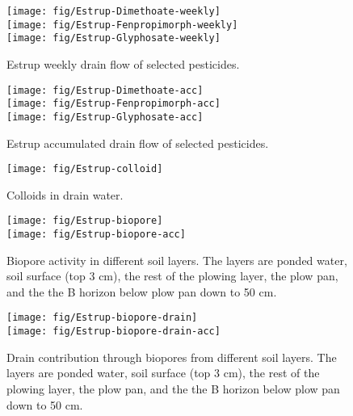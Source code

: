 \begin{figure}[htbp]
  \begin{center}
    \texttt{[image: fig/Estrup-Dimethoate-weekly]}\\
    \texttt{[image: fig/Estrup-Fenpropimorph-weekly]}\\
    \texttt{[image: fig/Estrup-Glyphosate-weekly]}\\
  \end{center}
  \caption{Estrup weekly drain flow of selected pesticides.}
  \label{fig:Estrup-weekly}
\end{figure}\FloatBarrier

\begin{figure}[htbp]
  \begin{center}
    \texttt{[image: fig/Estrup-Dimethoate-acc]}\\
    \texttt{[image: fig/Estrup-Fenpropimorph-acc]}\\
    \texttt{[image: fig/Estrup-Glyphosate-acc]}\\
  \end{center}
  \caption{Estrup accumulated drain flow of selected pesticides.}
  \label{fig:Estrup-acc}
\end{figure}\FloatBarrier

\begin{figure}[htbp]
  \begin{center}
    \texttt{[image: fig/Estrup-colloid]}
  \end{center}
  \caption{Colloids in drain water.}
  \label{fig:Estrup-colloids}
\end{figure}\FloatBarrier

\begin{figure}[htbp]
  \begin{center}
    \texttt{[image: fig/Estrup-biopore]}\\
    \texttt{[image: fig/Estrup-biopore-acc]}\\
  \end{center}
  \caption{Biopore activity in different soil layers.  The layers are
    ponded water, soil surface (top 3 cm), the rest of the plowing layer,
    the plow pan, and the the B horizon below plow pan down to 50 cm.}
  \label{fig:Estrup-biopore}
\end{figure}\FloatBarrier

\begin{figure}[htbp]
  \begin{center}
    \texttt{[image: fig/Estrup-biopore-drain]}\\
    \texttt{[image: fig/Estrup-biopore-drain-acc]}
  \end{center}
  \caption{Drain contribution through biopores from different soil
    layers.  The layers are ponded water, soil surface (top 3 cm), the
    rest of the plowing layer, the plow pan, and the the B horizon
    below plow pan down to 50 cm.}
  \label{fig:Estrup-biopore-drain}
\end{figure}\FloatBarrier
